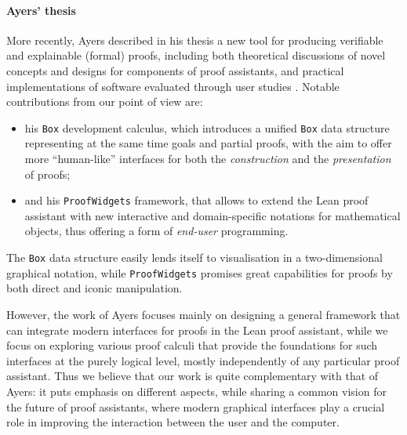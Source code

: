 \paragraph{Ayers' thesis}

More recently, Ayers described in his thesis a new tool for producing verifiable
and explainable (formal) proofs, including both theoretical discussions of novel
concepts and designs for components of proof assistants, and practical
implementations of software evaluated through user studies
. Notable contributions from our point of view are:
\begin{itemize}
  \item his \texttt{Box} development calculus, which introduces a unified
\texttt{Box} data structure representing at the same time goals and partial
proofs, with the aim to offer more ``human-like'' interfaces for both the
\emph{construction} and the \emph{presentation} of proofs;
  \item and his \texttt{ProofWidgets} framework, that allows to extend the Lean
proof assistant with new interactive and domain-specific notations for
mathematical objects, thus offering a form of \emph{end-user} programming.
\end{itemize}
The \texttt{Box} data structure easily lends itself to visualisation in a
two-dimensional graphical notation, while \texttt{ProofWidgets} promises great
capabilities for proofs by both direct and iconic manipulation.

However, the work of Ayers focuses mainly on designing a general framework that
can integrate modern interfaces for proofs in the Lean proof assistant, while we
focus on exploring various proof calculi that provide the foundations for such
interfaces at the purely logical level, mostly independently of any particular
proof assistant. Thus we believe that our work is quite complementary with that
of Ayers: it puts emphasis on different aspects, while sharing a common vision
for the future of proof assistants, where modern graphical interfaces play a
crucial role in improving the interaction between the user and the computer.